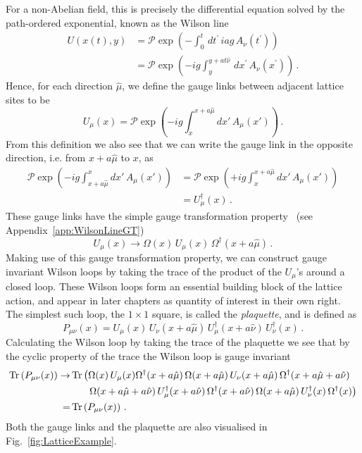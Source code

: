 For a non-Abelian field, this is precisely the differential equation solved by the path-ordered exponential, known as the Wilson line
%
\begin{align*}
U(x(t),y) &= \mathcal{P}\exp\left(-\int_0^t \,dt^\prime\, iag \,A_\nu(t^\prime)\right)\\
&=\mathcal{P}\exp\left(-ig\int_{y}^{y+at\hat{\nu}}\,dx^\prime\, A_\nu\left(x^\prime\right)\right)\, .
\end{align*}
%
Hence, for each direction $\hat{\mu}$, we define the gauge links between adjacent lattice sites to be
%
\begin{equation}
U_\mu(x) = \mathcal{P}\exp\left(-ig\int_x^{x+a\hat{\mu}}dx'\,A_\mu(x')\right)\, .
\label{eq:GaugeLink}
\end{equation}
%
From this definition we also see that we can write the gauge link in the opposite direction, i.e. from $x+a\hat{\mu}$ to $x$, as
%
\begin{align*}
\mathcal{P}\exp\left(-ig\int^x_{x+a\hat{\mu}}dx'\,A_\mu(x')\right) &= \mathcal{P}\exp\left(+ig\int_x^{x+a\hat{\mu}}dx'\,A_\mu(x')\right)\\
&=U^\dag_\mu(x)\, .
\end{align*}
%
These gauge links have the simple gauge transformation property~\cite{Lepage:1998dt} (see Appendix~\ref{app:WilsonLineGT})
%
\begin{equation}
U_\mu(x)\rightarrow \Omega(x)\,U_\mu(x)\,\Omega^\dag(x+a\hat{\mu})\, .
\label{eq:LinkTransformation}
\end{equation}
%
Making use of this gauge transformation property, we can construct gauge invariant Wilson loops by taking the trace of the product of the $U_\mu$'s around a closed loop. These Wilson loops form an essential building block of the lattice action, and  appear in later chapters as quantity of interest in their own right. The simplest such loop, the $1\times 1$ square, is called the \textit{plaquette}, and is defined as
\begin{equation}
P_{\mu\nu}(x) = U_\mu(x)\,U_\nu(x+a\hat{\mu})\, U_\mu^\dag(x+a\hat{\nu})\, U_\nu^\dag(x)\, .
\label{eq:Plaquette}
\end{equation}
Calculating the Wilson loop by taking the trace of the plaquette we see that by the cyclic property of the trace the Wilson loop is gauge invariant
\begin{align*}
\operatorname{Tr}\left(P_{\mu\nu}(x)\right)\rightarrow& \operatorname{Tr} \left(\Omega(x)\,U_\mu(x)\Omega^\dag(x+a\hat{\mu})\,\Omega(x+a\hat{\mu})\,U_\nu(x+a\hat{\mu})\,\Omega^\dag(x+a\hat{\mu}+a\hat{\nu})\right.\\
&~~~~~\left.\Omega(x+a\hat{\mu}+a\hat{\nu})\,U_\mu^\dag(x+a\hat{\nu})\,\Omega^\dag(x+a\hat{\nu})\,\Omega(x+a\hat{\mu})\, U_\nu^\dag(x)\,\Omega^\dag(x)\right)\\
=&\operatorname{Tr}\left(P_{\mu\nu}(x)\right)\, .
\end{align*}
Both the gauge links and the plaquette are also visualised in Fig.~\ref{fig:LatticeExample}.\\


